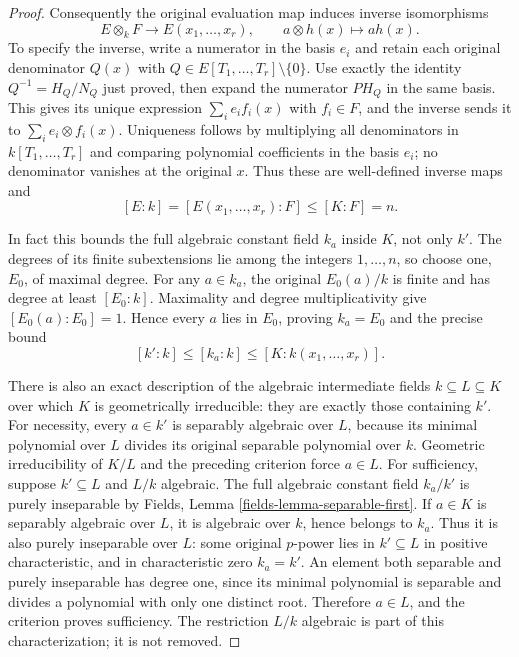 \begin{proof}
Consequently the original evaluation
map induces inverse isomorphisms
$$
E\otimes_k F\longrightarrow E(x_1,\ldots,x_r),
\qquad a\otimes h(x)\longmapsto a h(x).
$$
To specify the inverse, write a
numerator in the basis $e_i$ and
retain each original denominator
$Q(x)$ with $Q\in E[T_1,\ldots,T_r]\setminus\{0\}$.
Use exactly the identity
$Q^{-1}=H_Q/N_Q$ just proved,
then expand the numerator $P H_Q$
in the same basis. This gives
its unique expression
$\sum_i e_i f_i(x)$ with $f_i\in F$,
and the inverse sends it to
$\sum_i e_i\otimes f_i(x)$.
Uniqueness follows by multiplying
all denominators in $k[T_1,\ldots,T_r]$
and comparing polynomial coefficients
in the basis $e_i$; no denominator
vanishes at the original $x$.
Thus these are well-defined inverse
maps and
$$
[E:k]=[E(x_1,\ldots,x_r):F]\leq[K:F]=n.
$$

In fact this bounds the full
algebraic constant field $k_a$
inside $K$, not only $k'$.
The degrees of its finite
subextensions lie among the
integers $1,\ldots,n$, so choose
one, $E_0$, of maximal degree.
For any $a\in k_a$, the original
$E_0(a)/k$ is finite and has
degree at least $[E_0:k]$.
Maximality and degree multiplicativity
give $[E_0(a):E_0]=1$. Hence every
$a$ lies in $E_0$, proving
$k_a=E_0$ and the precise bound
$$
[k':k]\leq[k_a:k]\leq[K:k(x_1,\ldots,x_r)].
$$

There is also an exact description
of the algebraic intermediate
fields $k\subseteq L\subseteq K$
over which $K$ is geometrically
irreducible: they are exactly
those containing $k'$.
For necessity, every $a\in k'$
is separably algebraic over $L$,
because its minimal polynomial
over $L$ divides its original
separable polynomial over $k$.
Geometric irreducibility of $K/L$
and the preceding criterion force
$a\in L$. For sufficiency, suppose
$k'\subseteq L$ and $L/k$ algebraic.
The full algebraic constant field
$k_a/k'$ is purely inseparable
by Fields, Lemma
\ref{fields-lemma-separable-first}.
If $a\in K$ is separably algebraic
over $L$, it is algebraic over
$k$, hence belongs to $k_a$.
Thus it is also purely inseparable
over $L$: some original $p$-power
lies in $k'\subseteq L$ in positive
characteristic, and in characteristic
zero $k_a=k'$. An element both
separable and purely inseparable
has degree one, since its minimal
polynomial is separable and divides
a polynomial with only one distinct
root. Therefore $a\in L$, and the
criterion proves sufficiency.
The restriction $L/k$ algebraic
is part of this characterization;
it is not removed.
\end{proof}